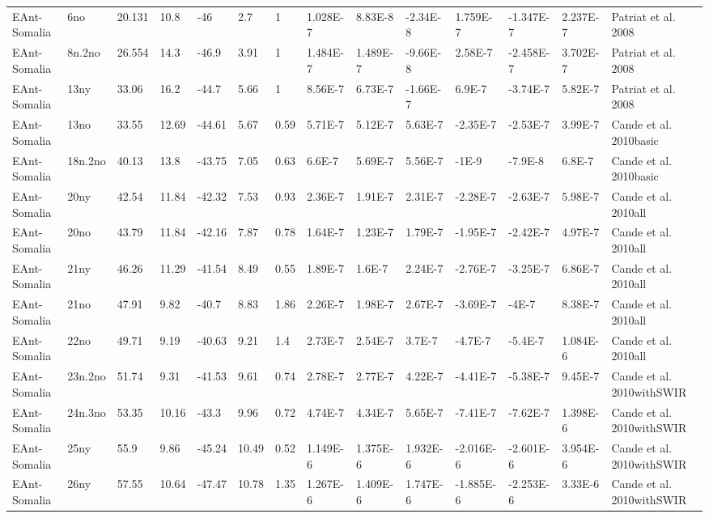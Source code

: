 \begin{landscape}
\begin{longtable}{@{}lllllllllllllp{3.5cm}@{}}
EAnt-Somalia & 6no & 20.131 & 10.8 & -46 & 2.7 & 1 & 1.028E-7 & 8.83E-8 & -2.34E-8 & 1.759E-7 & -1.347E-7 & 2.237E-7 & Patriat et al. 2008 \\
EAnt-Somalia & 8n.2no & 26.554 & 14.3 & -46.9 & 3.91 & 1 & 1.484E-7 & 1.489E-7 & -9.66E-8 & 2.58E-7 & -2.458E-7 & 3.702E-7 & Patriat et al. 2008 \\
EAnt-Somalia & 13ny & 33.06 & 16.2 & -44.7 & 5.66 & 1 & 8.56E-7 & 6.73E-7 & -1.66E-7 & 6.9E-7 & -3.74E-7 & 5.82E-7 & Patriat et al. 2008 \\
EAnt-Somalia & 13no & 33.55 & 12.69 & -44.61 & 5.67 & 0.59 & 5.71E-7 & 5.12E-7 & 5.63E-7 & -2.35E-7 & -2.53E-7 & 3.99E-7 & Cande et al. 2010basic \\
EAnt-Somalia & 18n.2no & 40.13 & 13.8 & -43.75 & 7.05 & 0.63 & 6.6E-7 & 5.69E-7 & 5.56E-7 & -1E-9 & -7.9E-8 & 6.8E-7 & Cande et al. 2010basic \\
EAnt-Somalia & 20ny & 42.54 & 11.84 & -42.32 & 7.53 & 0.93 & 2.36E-7 & 1.91E-7 & 2.31E-7 & -2.28E-7 & -2.63E-7 & 5.98E-7 & Cande et al. 2010all \\
EAnt-Somalia & 20no & 43.79 & 11.84 & -42.16 & 7.87 & 0.78 & 1.64E-7 & 1.23E-7 & 1.79E-7 & -1.95E-7 & -2.42E-7 & 4.97E-7 & Cande et al. 2010all \\
EAnt-Somalia & 21ny & 46.26 & 11.29 & -41.54 & 8.49 & 0.55 & 1.89E-7 & 1.6E-7 & 2.24E-7 & -2.76E-7 & -3.25E-7 & 6.86E-7 & Cande et al. 2010all \\
EAnt-Somalia & 21no & 47.91 & 9.82 & -40.7 & 8.83 & 1.86 & 2.26E-7 & 1.98E-7 & 2.67E-7 & -3.69E-7 & -4E-7 & 8.38E-7 & Cande et al. 2010all \\
EAnt-Somalia & 22no & 49.71 & 9.19 & -40.63 & 9.21 & 1.4 & 2.73E-7 & 2.54E-7 & 3.7E-7 & -4.7E-7 & -5.4E-7 & 1.084E-6 & Cande et al. 2010all \\
EAnt-Somalia & 23n.2no & 51.74 & 9.31 & -41.53 & 9.61 & 0.74 & 2.78E-7 & 2.77E-7 & 4.22E-7 & -4.41E-7 & -5.38E-7 & 9.45E-7 & Cande et al. 2010withSWIR \\
EAnt-Somalia & 24n.3no & 53.35 & 10.16 & -43.3 & 9.96 & 0.72 & 4.74E-7 & 4.34E-7 & 5.65E-7 & -7.41E-7 & -7.62E-7 & 1.398E-6 & Cande et al. 2010withSWIR \\
EAnt-Somalia & 25ny & 55.9 & 9.86 & -45.24 & 10.49 & 0.52 & 1.149E-6 & 1.375E-6 & 1.932E-6 & -2.016E-6 & -2.601E-6 & 3.954E-6 & Cande et al. 2010withSWIR \\
EAnt-Somalia & 26ny & 57.55 & 10.64 & -47.47 & 10.78 & 1.35 & 1.267E-6 & 1.409E-6 & 1.747E-6 & -1.885E-6 & -2.253E-6 & 3.33E-6 & Cande et al. 2010withSWIR \\

\end{longtable}
\end{landscape}
